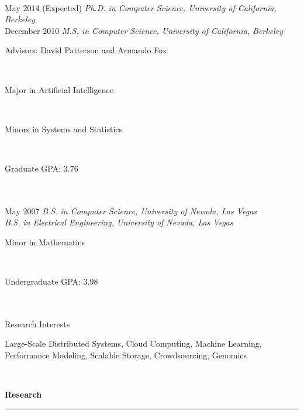 \documentclass[11pt]{article}
\newcommand{\parwidth}{4.8 in}
\newcommand{\tabwidth}{2.0 in}
\newcommand{\head}[1]{
{\bf #1} \\
\rule{\textwidth}{0.01 in}

\vspace{-0.35 in}

}
\begin{document}
\begin{tabbing}
\hspace{\tabwidth} \= \\ 

May 2014 (Expected) \> \emph{Ph.D. in Computer Science, University of California, Berkeley} \\ 
December 2010 \> \emph{M.S. in Computer Science, University of California, Berkeley} \\ 
\> \parbox[t]{\parwidth}{Advisors: David Patterson and Armando Fox } \\ 
\> \parbox[t]{\parwidth}{Major in Artificial Intelligence} \\
\> \parbox[t]{\parwidth}{Minors in Systems and Statistics} \\
\> \parbox[t]{\parwidth}{Graduate GPA: 3.76} \\ \\

May 2007 \> \emph{B.S. in Computer Science, University of Nevada, Las Vegas} \\ 
\> \emph{B.S. in Electrical Engineering, University of Nevada, Las Vegas} \\ 
\> \parbox[t]{\parwidth}{Minor in Mathematics} \\
\> \parbox[t]{\parwidth}{Undergraduate GPA: 3.98} \\ \\

Research Interests \> \parbox[t]{\parwidth}{
Large-Scale Distributed Systems, Cloud Computing, Machine Learning, Performance Modeling, Scalable Storage, Crowdsourcing, Genomics
} \\

\end{tabbing}



\head{Research}
\end{document}
